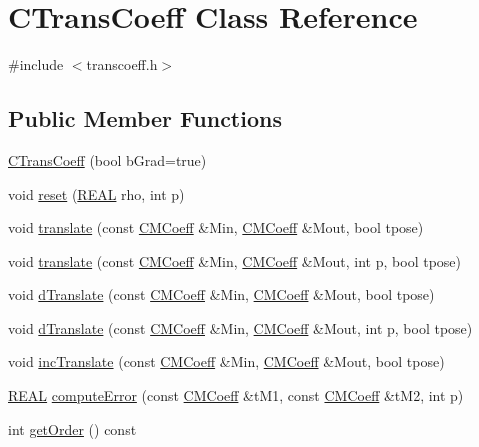 \hypertarget{classCTransCoeff}{\section{C\-Trans\-Coeff Class Reference}
\label{classCTransCoeff}
}


{\ttfamily \#include $<$transcoeff.\-h$>$}

\subsection*{Public Member Functions}
\begin{DoxyCompactItemize}
\item 
\hyperlink{classCTransCoeff_a1b4eb40fb4a4d8efb14ad684c1a169d4}{C\-Trans\-Coeff} (bool b\-Grad=true)
\item 
void \hyperlink{classCTransCoeff_ade17444acf44e5c80f8caa9a593f03ee}{reset} (\hyperlink{util_8h_a5821460e95a0800cf9f24c38915cbbde}{R\-E\-A\-L} rho, int p)
\item 
void \hyperlink{classCTransCoeff_a0152b91eec8d84278e6432019ce4ef91}{translate} (const \hyperlink{classCMCoeff}{C\-M\-Coeff} \&Min, \hyperlink{classCMCoeff}{C\-M\-Coeff} \&Mout, bool tpose)
\item 
void \hyperlink{classCTransCoeff_a15c1d9affb86e989dc0beefa0683effb}{translate} (const \hyperlink{classCMCoeff}{C\-M\-Coeff} \&Min, \hyperlink{classCMCoeff}{C\-M\-Coeff} \&Mout, int p, bool tpose)
\item 
void \hyperlink{classCTransCoeff_a909121581454680f2b50f797f22715f0}{d\-Translate} (const \hyperlink{classCMCoeff}{C\-M\-Coeff} \&Min, \hyperlink{classCMCoeff}{C\-M\-Coeff} \&Mout, bool tpose)
\item 
void \hyperlink{classCTransCoeff_af1e5496a4734710f04841a202346aefb}{d\-Translate} (const \hyperlink{classCMCoeff}{C\-M\-Coeff} \&Min, \hyperlink{classCMCoeff}{C\-M\-Coeff} \&Mout, int p, bool tpose)
\item 
void \hyperlink{classCTransCoeff_a0b68420a4ae33fc1e8fa3dd00daf413c}{inc\-Translate} (const \hyperlink{classCMCoeff}{C\-M\-Coeff} \&Min, \hyperlink{classCMCoeff}{C\-M\-Coeff} \&Mout, bool tpose)
\item 
\hyperlink{util_8h_a5821460e95a0800cf9f24c38915cbbde}{R\-E\-A\-L} \hyperlink{classCTransCoeff_a9fb52e0afd88150756506af029f86611}{compute\-Error} (const \hyperlink{classCMCoeff}{C\-M\-Coeff} \&t\-M1, const \hyperlink{classCMCoeff}{C\-M\-Coeff} \&t\-M2, int p)
\item 
int \hyperlink{classCTransCoeff_a3c10d7ee9ead85dab5c5d2301cb6bb81}{get\-Order} () const 

\end{DoxyCompactItemize}
